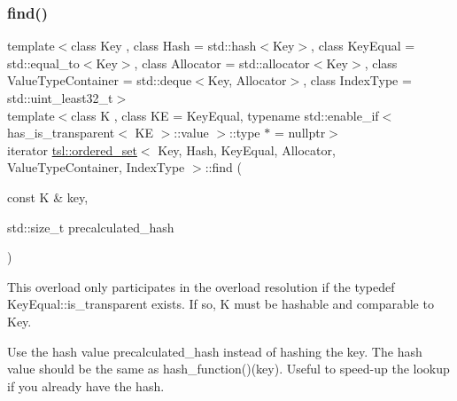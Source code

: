 \subsubsection{\texorpdfstring{find()}{find()}\hspace{0.1cm}{\footnotesize\ttfamily [4/6]}}
{\footnotesize\ttfamily template$<$class Key , class Hash  = std\+::hash$<$\+Key$>$, class Key\+Equal  = std\+::equal\+\_\+to$<$\+Key$>$, class Allocator  = std\+::allocator$<$\+Key$>$, class Value\+Type\+Container  = std\+::deque$<$\+Key, Allocator$>$, class Index\+Type  = std\+::uint\+\_\+least32\+\_\+t$>$ \\
template$<$class K , class KE  = Key\+Equal, typename std\+::enable\+\_\+if$<$ has\+\_\+is\+\_\+transparent$<$ K\+E $>$\+::value $>$\+::type $\ast$  = nullptr$>$ \\
iterator \mbox{\hyperlink{classtsl_1_1ordered__set}{tsl\+::ordered\+\_\+set}}$<$ Key, Hash, Key\+Equal, Allocator, Value\+Type\+Container, Index\+Type $>$\+::find (\begin{DoxyParamCaption}\item[{const K \&}]{key,  }\item[{std\+::size\+\_\+t}]{precalculated\+\_\+hash }\end{DoxyParamCaption})\hspace{0.3cm}{\ttfamily [inline]}}





This overload only participates in the overload resolution if the typedef Key\+Equal\+::is\+\_\+transparent exists. If so, K must be hashable and comparable to Key.

Use the hash value \textquotesingle{}precalculated\+\_\+hash\textquotesingle{} instead of hashing the key. The hash value should be the same as hash\+\_\+function()(key). Useful to speed-\/up the lookup if you already have the hash. \mbox{\label{classtsl_1_1ordered__set_a32f4eb260419db865a600bb927fde308}} 
